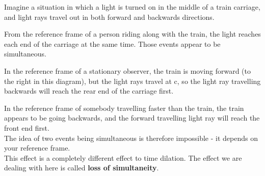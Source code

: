 \documentclass[revision-guide.tex]{subfiles}
\begin{document}
Imagine a situation in which a light is turned on in the middle of a train carriage, and light rays travel out in both forward and backwards directions. 
\\
\begin{figure}[h]
	\begin{center}
		
		
	\end{center}
\end{figure}
From the reference frame of a person riding along with the train, the light reaches each end of the carriage at the same time. Those events appear to be simultaneous.
\\
\begin{figure}[h]
	\begin{center}
		
		
	\end{center}
\end{figure}
In the reference frame of a stationary observer, the train is moving forward (to the right in this diagram), but the light rays travel at c, so the light ray travelling backwards will reach the rear end of the carriage first. 
\\

\begin{figure}[h]
	\begin{center}
		
		
	\end{center}
\end{figure}
In the reference frame of somebody travelling faster than the train, the train appears to be going backwards, and the forward travelling light ray will reach the front end first. 
\\
The idea of two events being simultaneous is therefore impossible - it depends on your reference frame.
\\

This effect is  a completely different effect to time dilation.  The effect we are dealing with here is called \textbf{loss of simultaneity}.
\end{document}
